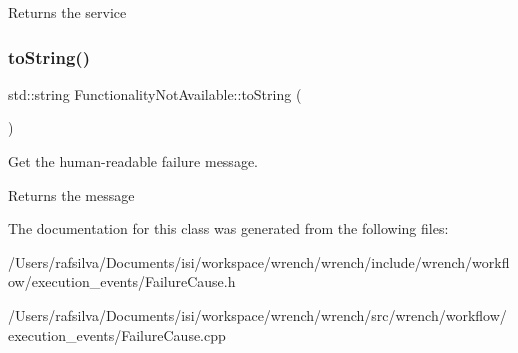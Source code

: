 \begin{DoxyReturn}{Returns}
the service 
\end{DoxyReturn}
\mbox{\label{class_functionality_not_available_a06c66f75f62a42042e16f8462cc7e0ea}} 
\subsubsection{\texorpdfstring{to\+String()}{toString()}}
{\footnotesize\ttfamily std\+::string Functionality\+Not\+Available\+::to\+String (\begin{DoxyParamCaption}{ }\end{DoxyParamCaption})}



Get the human-\/readable failure message. 

\begin{DoxyReturn}{Returns}
the message 
\end{DoxyReturn}


The documentation for this class was generated from the following files\+:\begin{DoxyCompactItemize}
\item 
/\+Users/rafsilva/\+Documents/isi/workspace/wrench/wrench/include/wrench/workflow/execution\+\_\+events/Failure\+Cause.\+h\item 
/\+Users/rafsilva/\+Documents/isi/workspace/wrench/wrench/src/wrench/workflow/execution\+\_\+events/Failure\+Cause.\+cpp\end{DoxyCompactItemize}
